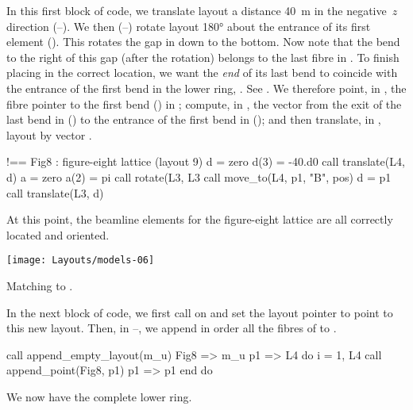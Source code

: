 %
In this first block of code, we translate layout  a
distance \SI{40}{m} in the negative~$z$ direction
(--).
We then (--) rotate layout
 \ang{180} about the entrance of its first element
(). This rotates the gap in 
down to the bottom. Now note that the bend to the right of this
gap (after the rotation) belongs to the last fibre in .
To finish placing  in the correct location, we want the
\emph{end} of its last bend to coincide with the entrance of the
first bend in the lower ring, . See .
We therefore point, in , the fibre pointer
 to the first bend () in ; compute, in
, the vector  from the exit of the last
bend in  () to the entrance of
the first bend in  (); and then
translate, in , layout  by vector .
%
\begin{ptccode}
!== Fig8 : figure-eight lattice (layout 9)
d = zero                                \label{lin:fig8.btr4}
d(3) = -40.d0
call translate(L4, d)                   \label{lin:fig8.etr4}
a = zero                                \label{lin:fig8.brot}
a(2) = pi
call rotate(L3, L3%
call move_to(L4, p1, "B", pos)          \label{lin:fig8.mvp1}
d = p1%
call translate(L3, d)                   \label{lin:fig8.tr3}
\end{ptccode}
%
At this point, the beamline elements for the figure-eight lattice
are all correctly located and oriented.

\begin{marginfigure}[-29\baselineskip]\forceversofloat
  \texttt{[image: Layouts/models-06]}
  \caption{Matching  to .}
  \label{fig:ring.match}
\end{marginfigure}

%
In the next block of code, we first call 
on  and set the layout pointer  to point to this
new layout. Then, in --,
we append in order all the fibres of  to .
%
\begin{ptccode}
call append_empty_layout(m_u)
Fig8 => m_u%
p1 => L4%
do i = 1, L4%
  call append_point(Fig8, p1)
  p1 => p1%
end do                         \label{lin:fig8.eapp.L4}
\end{ptccode}
%
We now have the complete lower ring.

